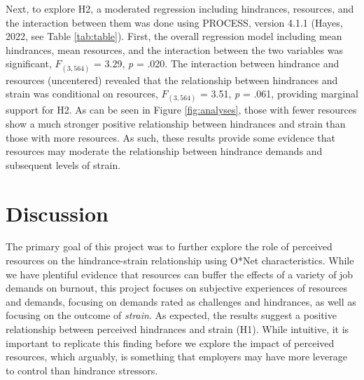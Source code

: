 \documentclass[
  man]{apa6}
\begin{document}
Next, to explore H2, a moderated regression including hindrances, resources, and the interaction between them was done using PROCESS, version 4.1.1 (Hayes, 2022, see Table \ref{tab:table}). First, the overall regression model including mean hindrances, mean resources, and the interaction between the two variables was significant, \(F_{(3, 564)}\) = 3.29, \emph{p} = .020. The interaction between hindrance and resources (uncentered) revealed that the relationship between hindrances and strain was conditional on resources, \(F_{(3, 564)}\) = 3.51, \emph{p} = .061, providing marginal support for H2. As can be seen in Figure \ref{fig:analyses}, those with fewer resources show a much stronger positive relationship between hindrances and strain than those with more resources. As such, these results provide some evidence that resources may moderate the relationship between hindrance demands and subsequent levels of strain.

\hypertarget{discussion}{%
\section{Discussion}\label{discussion}}

The primary goal of this project was to further explore the role of perceived resources on the hindrance-strain relationship using O*Net characteristics. While we have plentiful evidence that resources can buffer the effects of a variety of job demands on burnout, this project focuses on subjective experiences of resources and demands, focusing on demands rated as challenges and hindrances, as well as focusing on the outcome of \emph{strain}. As expected, the results suggest a positive relationship between perceived hindrances and strain (H1). While intuitive, it is important to replicate this finding before we explore the impact of perceived resources, which arguably, is something that employers may have more leverage to control than hindrance stressors.
\end{document}
